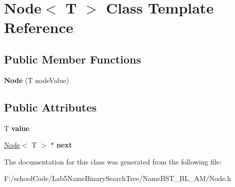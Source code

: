 \hypertarget{class_node}{}\section{Node$<$ T $>$ Class Template Reference}
\label{class_node}
\subsection*{Public Member Functions}
\begin{DoxyCompactItemize}
\item 
\mbox{\label{class_node_a4e3df66257b4851eac0d1dcd18f9faa6}} 
{\bfseries Node} (T node\+Value)
\end{DoxyCompactItemize}
\subsection*{Public Attributes}
\begin{DoxyCompactItemize}
\item 
\mbox{\label{class_node_a01b9071c0de774c720b64583262d1559}} 
T {\bfseries value}
\item 
\mbox{\label{class_node_a8bedac90cd0aedd2847dd49f671d4d4a}} 
\hyperlink{class_node}{Node}$<$ T $>$ $\ast$ {\bfseries next}
\end{DoxyCompactItemize}


The documentation for this class was generated from the following file\+:\begin{DoxyCompactItemize}
\item 
F\+:/school\+Code/\+Lab5\+Name\+Binary\+Search\+Tree/\+Name\+B\+S\+T\+\_\+\+B\+L\+\_\+\+A\+M/Node.\+h\end{DoxyCompactItemize}
